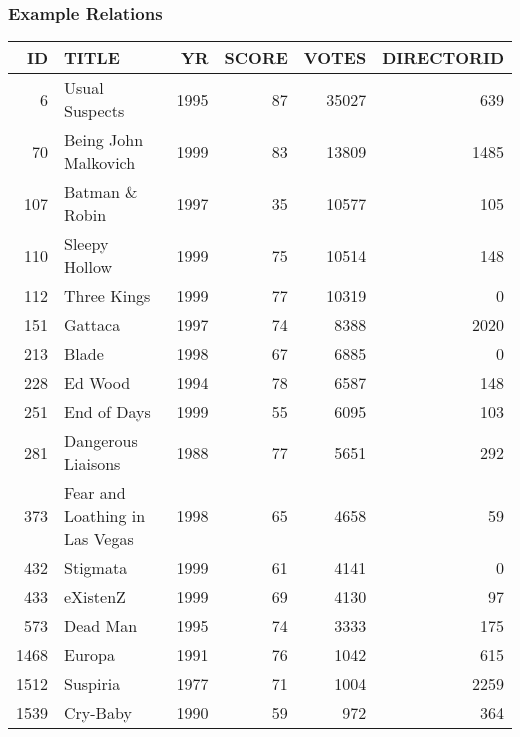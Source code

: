 \documentclass[dvipsnames]{beamer}
\theoremstyle{plain}
\begin{document}
\begin{frame}
  \frametitle{Example Relations}

  \begin{example}
    \begin{tiny}
    \begin{table}
      \begin{tabular}{|r|l|r|r|r|r|}\hline
  ID & TITLE                          &   YR & SCORE & VOTES & DIRECTORID\\\hline\hline
   6 & Usual Suspects                 & 1995 &    87 & 35027 &        639\\\hline
  70 & Being John Malkovich           & 1999 &    83 & 13809 &       1485\\\hline
 107 & Batman \& Robin                & 1997 &    35 & 10577 &        105\\\hline
 110 & Sleepy Hollow                  & 1999 &    75 & 10514 &        148\\\hline
 112 & Three Kings                    & 1999 &    77 & 10319 &          0\\\hline
 151 & Gattaca                        & 1997 &    74 &  8388 &       2020\\\hline
 213 & Blade                          & 1998 &    67 &  6885 &          0\\\hline
 228 & Ed Wood                        & 1994 &    78 &  6587 &        148\\\hline
 251 & End of Days                    & 1999 &    55 &  6095 &        103\\\hline
 281 & Dangerous Liaisons             & 1988 &    77 &  5651 &        292\\\hline
 373 & Fear and Loathing in Las Vegas & 1998 &    65 &  4658 &         59\\\hline
 432 & Stigmata                       & 1999 &    61 &  4141 &          0\\\hline
 433 & eXistenZ                       & 1999 &    69 &  4130 &         97\\\hline
 573 & Dead Man                       & 1995 &    74 &  3333 &        175\\\hline
1468 & Europa                         & 1991 &    76 &  1042 &        615\\\hline
1512 & Suspiria                       & 1977 &    71 &  1004 &       2259\\\hline
1539 & Cry-Baby                       & 1990 &    59 &   972 &        364\\\hline
    \end{tabular}
  \end{table}
  \end{tiny}
  \end{example}
\end{frame}
\end{document}
